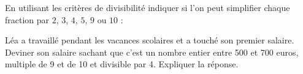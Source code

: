 \documentclass[main.tex]{subfiles}
\begin{document}
\medskip
\begin{exercise}\hfill 
	
	 En utilisant les critères de divisibilité  indiquer si l'on peut simplifier chaque fraction par $2$, $3$, $4$, $5$, $9$ ou $10$ :
	
\noindent\parbox{0.5\linewidth}{
}\hfill \parbox{0.5\linewidth}{
}

\end{exercise} 
\medskip
\begin{exercise}\hfill 
	
\noindent	Léa a travaillé pendant les vacances scolaires et a touché son premier salaire.
	Deviner son salaire sachant que c’est un nombre entier entre 500 et 700 euros, multiple de 9 et de 10 et divisible par 4. 
	Expliquer la réponse.
\end{exercise}
\end{document}
